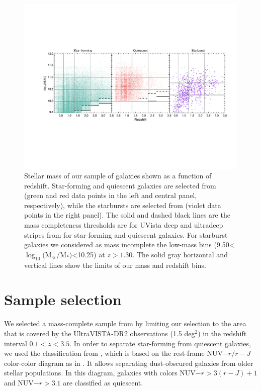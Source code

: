    \begin{figure}
   \centering
   \includegraphics[trim={2cm 6cm 1cm 5.5cm}, clip, width=\textwidth]{Figs/Chapter2/M_vs_z_separate.pdf}
    \caption{ Stellar mass of our sample of galaxies shown as a function of redshift. Star-forming and quiescent galaxies are selected from \citet{2016ApJS..224...24L} (green and red data points in the left and central panel, respectively), while the starbursts are selected from \citet{2013MNRAS.432...23G} (violet data points in the right panel).
                        The solid and dashed black lines are the mass completeness thresholds are for UVista
                        deep and ultradeep stripes from \citet{2016ApJS..224...24L} for star-forming and
                        quiescent galaxies. For starburst galaxies we considered as mass incomplete the low-mass
                        bins (9.50<$\log_{10}($M$_\sun$/M$_*)$<10.25) at $z>1.30$.
                The solid gray horizontal and vertical lines show the limits of our mass and redshift bins.
                }
         \label{fig:M_vs_z}
   \end{figure}


\section{Sample selection} \label{sec:sample}
We selected a mass-complete sample from \citet{2016ApJS..224...24L} by limiting our selection to the area that is covered by the UltraVISTA-DR2 observations (1.5 deg$^2$) in the redshift interval $0.1<z<3.5$. In order to separate star-forming from quiescent galaxies, we used the classification from \citet{2016ApJS..224...24L}, which  is based on the rest-frame NUV$ - r / r - J$ color-color diagram as in \citet{2013A&A...556A..55I}. It allows separating dust-obscured galaxies from older stellar populations. In this diagram, galaxies with colors NUV$ - r>3 (r-J)+1$ and NUV$ - r > 3.1$ are classified as quiescent.

